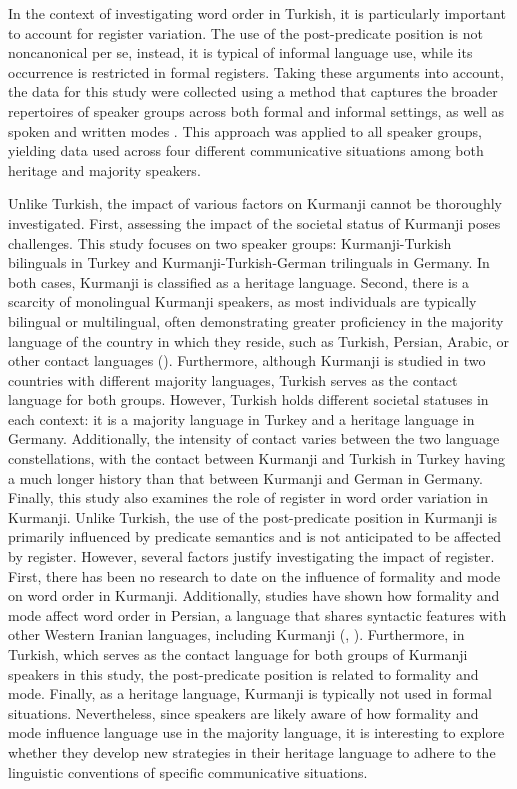 In the context of investigating word order in Turkish, it is particularly important to account for register variation. The use of the post-predicate position is not noncanonical per se, instead, it is typical of informal language use, while its occurrence is restricted in formal registers. Taking these arguments into account, the data for this study were collected using a method that captures the broader repertoires of speaker groups across both formal and informal settings, as well as spoken and written modes \citep{Wiese2020}. This approach was applied to all speaker groups, yielding data used across four different communicative situations among both heritage and majority speakers.

Unlike Turkish, the impact of various factors on Kurmanji cannot be thoroughly investigated. First, assessing the impact of the societal status of Kurmanji poses challenges. This study focuses on two speaker groups: Kurmanji-Turkish bilinguals in Turkey and Kurmanji-Turkish-German trilinguals in Germany. In both cases, Kurmanji is classified as a heritage language. Second, there is a scarcity of monolingual Kurmanji speakers, as most individuals are typically bilingual or multilingual, often demonstrating greater proficiency in the majority language of the country in which they reside, such as Turkish, Persian, Arabic, or other contact languages (\citealt{BrizicnodateEtAl}). Furthermore, although Kurmanji is studied in two countries with different majority languages, Turkish serves as the contact language for both groups. However, Turkish holds different societal statuses in each context: it is a majority language in Turkey and a heritage language in Germany. Additionally, the intensity of contact varies between the two language constellations, with the contact between Kurmanji and Turkish in Turkey having a much longer history than that between Kurmanji and German in Germany. Finally, this study also examines the role of register in word order variation in Kurmanji. Unlike Turkish, the use of the post-predicate position in Kurmanji is primarily influenced by predicate semantics and is not anticipated to be affected by register. However, several factors justify investigating the impact of register. First, there has been no research to date on the influence of formality and mode on word order in Kurmanji. Additionally, studies have shown how formality and mode affect word order in Persian, a language that shares syntactic features with other Western Iranian languages, including Kurmanji (\citealt{Frommer1981}, \citealt{Haig_post-predicate_EtAl2024-1}). Furthermore, in Turkish, which serves as the contact language for both groups of Kurmanji speakers in this study, the post-predicate position is related to formality and mode. Finally, as a heritage language, Kurmanji is typically not used in formal situations. Nevertheless, since speakers are likely aware of how formality and mode influence language use in the majority language, it is interesting to explore whether they develop new strategies in their heritage language to adhere to the linguistic conventions of specific communicative situations.

